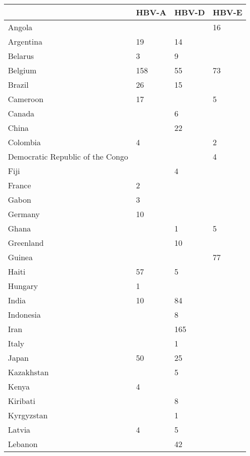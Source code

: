 \clearpage
\begin{longtable}{|l|l|l|l|}
    \hline
     & HBV-A & HBV-D & HBV-E \\ \hline
    \endfirsthead
    \endhead
    Angola &  &  & 16 \\ \hline
    Argentina & 19 & 14 &  \\ \hline
    Belarus & 3 & 9 &  \\ \hline
    Belgium & 158 & 55 & 73 \\ \hline
    Brazil & 26 & 15 &  \\ \hline
    Cameroon & 17 &  & 5 \\ \hline
    Canada &  & 6 &  \\ \hline
    China &  & 22 &  \\ \hline
    Colombia & 4 &  & 2 \\ \hline
    Democratic Republic of the Congo &  &  & 4 \\ \hline
    Fiji &  & 4 &  \\ \hline
    France & 2 &  &  \\ \hline
    Gabon & 3 &  &  \\ \hline
    Germany & 10 &  &  \\ \hline
    Ghana &  & 1 & 5 \\ \hline
    Greenland &  & 10 &  \\ \hline
    Guinea &  &  & 77 \\ \hline
    Haiti & 57 & 5 &  \\ \hline
    Hungary & 1 &  &  \\ \hline
    India & 10 & 84 &  \\ \hline
    Indonesia &  & 8 &  \\ \hline
    Iran &  & 165 &  \\ \hline
    Italy &  & 1 &  \\ \hline
    Japan & 50 & 25 &  \\ \hline
    Kazakhstan &  & 5 &  \\ \hline
    Kenya & 4 &  &  \\ \hline
    Kiribati &  & 8 &  \\ \hline
    Kyrgyzstan &  & 1 &  \\ \hline
    Latvia & 4 & 5 &  \\ \hline
    Lebanon &  & 42 &  \\ \hline

\end{longtable}
